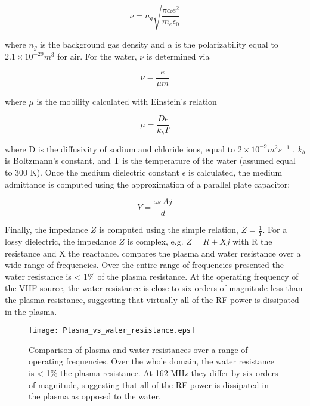 \begin{equation}
  \nu = n_g\sqrt{\frac{\pi \alpha e^2}{m_e\epsilon_0}}
  \label{eq:nu_plasma}
\end{equation}

where $n_g$ is the background gas density and $\alpha$ is the polarizability equal to $2.1\times10^{-29}m^3$ for air. For the water, $\nu$ is determined via

\begin{equation}
  \nu = \frac{e}{\mu m}
  \label{eq:nu_water}
\end{equation}

where $\mu$ is the mobility calculated with Einstein's relation

\begin{equation}
  \mu = \frac{D e}{k_b T}
  \label{eq:einstein}
\end{equation}

where D is the diffusivity of sodium and chloride ions, equal to $2\times10^{-9}m^2s^{-1}$ \cite{morrow2006time}, $k_b$ is Boltzmann's constant, and T is the temperature of the water (assumed equal to 300 K). Once the medium dielectric constant $\epsilon$ is calculated, the medium admittance is computed using the approximation of a parallel plate capacitor:

\begin{equation}
  Y = \frac{\omega \epsilon A j}{d}
  \label{eq:admittance}
\end{equation}

Finally, the impedance $Z$ is computed using the simple relation, $Z = \frac{1}{Y}$. For a lossy dielectric, the impedance $Z$ is complex, e.g. $Z = R + Xj$ with R the resistance and X the reactance.  compares the plasma and water resistance over a wide range of frequencies. Over the entire range of frequencies presented the water resistance is < 1\% of the plasma resistance. At the operating frequency of the VHF source, the water resistance is close to six orders of magnitude less than the plasma resistance, suggesting that virtually all of the RF power is dissipated in the plasma.

\begin{figure}[htbp]
  \centering
  \texttt{[image: Plasma\_vs\_water\_resistance.eps]}
  \caption{Comparison of plasma and water resistances over a range of operating frequencies. Over the whole domain, the water resistance is < 1\% the plasma resistance. At 162 MHz they differ by six orders of magnitude, suggesting that all of the RF power is dissipated in the plasma as opposed to the water.}
  \label{fig:resist_compare}
\end{figure}

